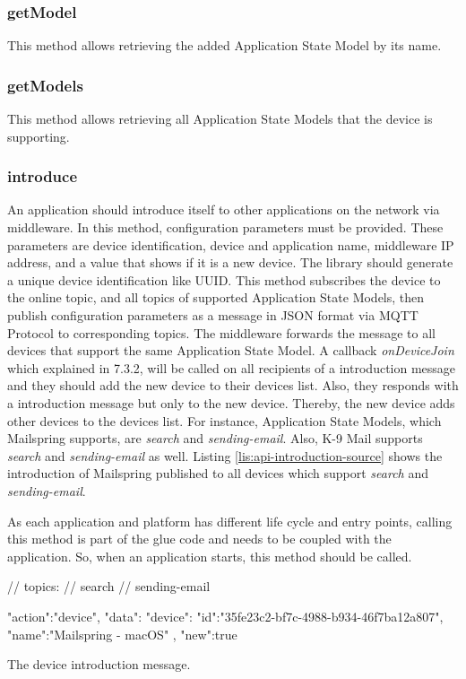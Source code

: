 \subsubsection{getModel}
This method allows retrieving the added Application State Model by its name.

\subsubsection{getModels}
This method allows retrieving all Application State Models that the device is supporting. 

\subsubsection{introduce}
An application should introduce itself to other applications on the network via middleware. In this method, configuration parameters must be provided. These parameters are device identification, device and application name, middleware IP address, and a value that shows if it is a new device. The library should generate a unique device identification like UUID. This method subscribes the device to the online topic, and all topics of supported Application State Models, then publish configuration parameters as a message in JSON format via MQTT Protocol to corresponding topics. The middleware forwards the message to all devices that support the same Application State Model. A callback \textit{onDeviceJoin} which explained in 7.3.2, will be called on all recipients of a introduction message and they should add the new device to their devices list. Also, they responds with a introduction message but only to the new device. Thereby, the new device adds other devices to the devices list. For instance, Application State Models, which Mailspring supports, are \textit{search} and \textit{sending-email}. Also, K-9 Mail supports \textit{search} and \textit{sending-email} as well. Listing \ref{lis:api-introduction-source} shows the introduction of Mailspring published to all devices which support \textit{search} and \textit{sending-email}.

As each application and platform has different life cycle and entry points, calling this method is part of the glue code and needs to be coupled with the application. So, when an application starts, this method should be called.

\FloatBarrier
\begin{code}
\begin{js2}
// topics:
// search
// sending-email
\end{js2}
\begin{json}
{
   "action":"device",
   "data":{
      "device":{
         "id":"35fe23c2-bf7c-4988-b934-46f7ba12a807",
         "name":"Mailspring - macOS"
      },
      "new":true
   }
}
\end{json}
\caption{The device introduction message.}
\label{lis:api-introduction-source}
\end{code}
\FloatBarrier


